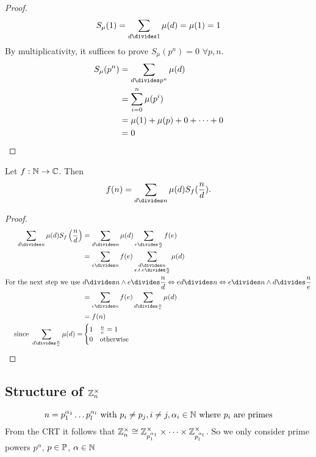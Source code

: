 \documentclass[NumTh.tex]{subfiles}
\begin{document}
\begin{proof}
  \[ S_\mu(1) = \sum_{d\divides 1} \mu(d) = \mu(1) = 1 \]
  By multiplicativity, it suffices to prove $S_\mu(p^n) = 0$ $\forall p,n$.
  \begin{align*}
    S_\mu(p^n) &= \sum_{d\divides p^n} \mu(d) \\
               &= \sum_{i=0}^n \mu(p^i) \\
               &= \mu(1) + \mu(p) + 0 +\dots+0 \\
               &= 0
  \end{align*}
\end{proof}

\begin{theorem}
  Let $f: \mathbb{N} \to \mathbb{C}$. Then
  \[ f(n) = \sum_{d\divides n} \mu(d) S_f(\frac{n}{d}) \text{.}\]
\end{theorem}

\begin{proof}
  \begin{align*}
    \sum_{d\divides n} \mu(d) S_f\left(\frac{n}{d}\right)
      &= \sum_{d\divides n} \mu(d) \sum_{e\divides \frac{n}{d}} f(e) \\
      &= \sum_{e\divides n} f(e) \sum_{\substack{d\divides n \\ s.t. e\divides \frac{n}{d}}} \mu(d) \\
      \text{For the next step we use }
		    &d\divides n \land e\divides \frac{n}{d}
		    \Leftrightarrow e d \divides n
		    \Leftrightarrow e\divides n \land d\divides \frac{n}{e}\\
      &= \sum_{e\divides n} f(e) \sum_{d\divides  \frac{n}{e}} \mu(d)\\
      &= f(n)\\
      \text{since }
        \sum_{d\divides  \frac{n}{e}} \mu(d) =
		&\begin{cases}
		  1 & \frac{n}{e} = 1 \\
		  0 & \text{otherwise}
		\end{cases}
  \end{align*}
\end{proof}


\subsection{Structure of $\mathbb{Z}_n^\times$}

\[ n = p_1^{\alpha_1} \dots p_l^{\alpha_l} \text{ with } p_i \neq p_j, i \neq j, \alpha_i \in \mathbb{N} \text{ where } p_i \text{ are primes} \]
From the CRT it follows that $\mathbb{Z}_n^\times \cong \mathbb{Z}_{p_1^{\alpha_1}}^\times \times \dots \times \mathbb{Z}_{p_l^{\alpha_l}}^\times$.
So we only consider prime powers $p^\alpha$, $p \in \mathbb{P}$, $\alpha \in \mathbb{N}$
\end{document}
